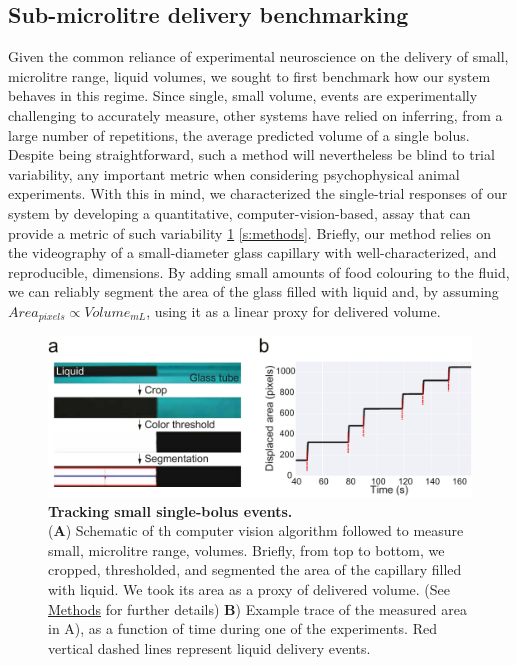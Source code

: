 \subsection*{Sub-microlitre delivery benchmarking}

Given the common reliance of experimental neuroscience on the delivery of small, microlitre range, liquid volumes, we sought to first benchmark how our system behaves in this regime. Since single, small volume, events are experimentally challenging to accurately measure, other systems have relied on inferring, from a large number of repetitions, the average predicted volume of a single bolus. Despite being straightforward, such a method will nevertheless be blind to trial variability, any important metric when considering psychophysical animal experiments. With this in mind, we characterized the single-trial responses of our system by developing a quantitative, computer-vision-based, assay that can provide a metric of such variability \ref{fig:PumpProtocol} \ref{s:methods}. Briefly, our method relies on the videography of a small-diameter glass capillary with well-characterized, and reproducible, dimensions. By adding small amounts of food colouring to the fluid, we can reliably segment the area of the glass filled with liquid and, by assuming $Area_{pixels} \propto Volume_{mL}$, using it as a linear proxy for delivered volume. 

\begin{figure} 
	\centering
	\includegraphics[width=1.0\linewidth]{Figures/Artboard 1_1.pdf}
	\caption{\textbf{Tracking small single-bolus events.}\\
		(\textbf{A}) Schematic of th computer vision algorithm followed to measure small, microlitre range, volumes. Briefly, from top to bottom, we cropped, thresholded, and segmented the area of the capillary filled with liquid. We took its area as a proxy of delivered volume. (See \hyperref[s:methods]{Methods} for further details)  \textbf{B}) Example trace of the measured area in A), as a function of time during one of the experiments. Red vertical dashed lines represent liquid delivery events.}
	\label{fig:PumpProtocol} 
\end{figure}

